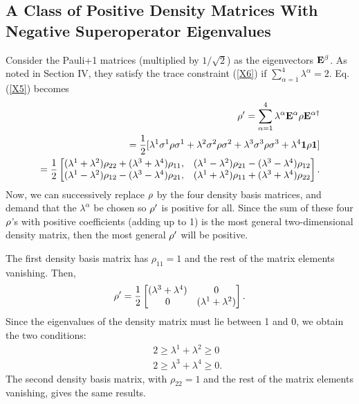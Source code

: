 \documentclass[aps,pra,twocolumn,amssymb, amsfonts,amsmath,showpacs, superscriptaddress]{revtex4}
\begin{document}
 \begin{appendix}
 \section{A Class of Positive Density Matrices With Negative Superoperator Eigenvalues}\label{A}
 Consider  the Pauli+1 matrices (multiplied by $1/\sqrt{2}$) as the eigenvectors ${\bf E}^{\beta}$. As noted in Section IV, they satisfy the trace constraint (\ref{X6}) if $\sum_{\alpha=1}^{4}\lambda^{\alpha}=2$. 
  Eq.(\ref{X5}) becomes 
\begin{eqnarray}\label{A1}
&&{\bf \rho}'
=\sum_{\alpha=1}^{4}\lambda^{\alpha}{\bf E}^{\alpha}{\bf\rho} {\bf E}^{\alpha\dagger}\nonumber\\
&&=\frac{1}{2}[\lambda^{1}{\bf \sigma}^{1}{\bf\rho} {\bf \sigma}^{1}+\lambda^{2}{\bf \sigma}^{2}{\bf\rho} {\bf \sigma}^{2}+\lambda^{3}{\bf \sigma}^{3}{\bf\rho} {\bf \sigma}^{3}+\lambda^{4}{\bf1}{\bf\rho} {\bf 1}]\nonumber\\
&&\negmedspace\negmedspace\negmedspace\negmedspace=\frac{1}{2}\begin{bmatrix}(\lambda^{1}+\lambda^{2})\rho_{22}+(\lambda^{3}+\lambda^{4})\rho_{11},&(\lambda^{1}-\lambda^{2})\rho_{21}-(\lambda^{3}-\lambda^{4})\rho_{12}
\\(\lambda^{1}-\lambda^{2})\rho_{12}-(\lambda^{3}-\lambda^{4})\rho_{21},&(\lambda^{1}+\lambda^{2})\rho_{11}+(\lambda^{3}+\lambda^{4})\rho_{22}
\end{bmatrix}.\nonumber\\
\end{eqnarray}
\noindent 
 \noindent Now, we can successively replace ${\bf \rho}$  by the four density basis matrices, and demand that the $\lambda^{\alpha}$ be chosen so ${\bf \rho}'$ is positive for all. Since the sum of these four ${\bf \rho}$'s with positive coefficients (adding up to 1) is the  most general two-dimensional density matrix, then the most general ${\bf \rho}'$ will be positive. 
 
 The first density basis matrix has $\rho_{11}=1$ and the rest of the matrix elements vanishing. Then, 
 \begin{equation}\label{A2}
{\bf \rho}'
=\frac{1}{2}\begin{bmatrix}(\lambda^{3}+\lambda^{4})&0
\\0&(\lambda^{1}+\lambda^{2})
\end{bmatrix}.
\end{equation}
Since the eigenvalues of the density matrix must lie between 1 and 0,  we obtain the two conditions:
 \begin{subequations}\label{A3}
 \begin{eqnarray}
&&2\geq\lambda^{1}+\lambda^{2}\geq 0\label{A3a}\\
&&2\geq\lambda^{3}+\lambda^{4}\geq 0.\label{A3b}
\end{eqnarray}
\end{subequations}
\noindent The second density basis matrix,  with $\rho_{22}=1$ and the rest of the matrix elements vanishing, gives the same results.


\end{appendix}
\end{document}
